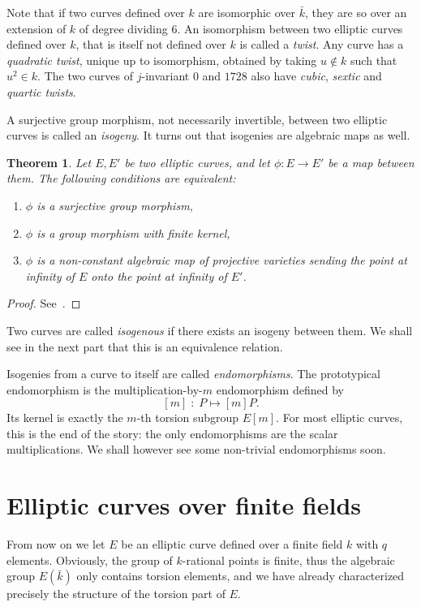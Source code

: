 \documentclass[10pt]{article}
\theoremstyle{plain}
\newtheorem{theorem}{Theorem}
\theoremstyle{definition}
\begin{document}
Note that if two curves defined over $k$ are isomorphic over
$\bar{k}$, they are so over an extension of $k$ of degree dividing
$6$. %
An isomorphism between two elliptic curves defined over $k$, that is
itself not defined over $k$ is called a \emph{twist}. %
Any curve has a \emph{quadratic twist}, unique up to isomorphism,
obtained by taking $u∉k$ such that $u^2∈k$. %
The two curves of $j$-invariant $0$ and $1728$ also have \emph{cubic},
\emph{sextic} and \emph{quartic twists}.

A surjective group morphism, not necessarily invertible, between two
elliptic curves is called an \emph{isogeny}. %
It turns out that isogenies are algebraic maps as well.

\begin{theorem}
  Let $E,E'$ be two elliptic curves, and let $\phi:E→E'$ be a map between
  them. %
  The following conditions are equivalent:
  \begin{enumerate}
  \item $\phi$ is a surjective group morphism,
  \item $\phi$ is a group morphism with finite kernel,
  \item $\phi$ is a non-constant algebraic map of projective varieties
    sending the point at infinity of $E$ onto the point at infinity of
    $E'$.
  \end{enumerate}
\end{theorem}
\begin{proof}
  See~\cite[III, Th.~4.8]{silverman:elliptic}.
\end{proof}

Two curves are called \emph{isogenous} if there exists an isogeny
between them. %
We shall see in the next part that this is an equivalence relation.

Isogenies from a curve to itself are called \emph{endomorphisms}. %
The prototypical endomorphism is the multiplication-by-$m$
endomorphism defined by
\[[m]\;:\; P \mapsto [m]P.\] %
Its kernel is exactly the $m$-th torsion subgroup $E[m]$. %
For most elliptic curves, this is the end of the story: the only
endomorphisms are the scalar multiplications. %
We shall however see some non-trivial endomorphisms soon.


\section{Elliptic curves over finite fields}

From now on we let $E$ be an elliptic curve defined over a finite
field $k$ with $q$ elements. %
Obviously, the group of $k$-rational points is finite, thus the
algebraic group $E(\bar{k})$ only contains torsion elements, and we
have already characterized precisely the structure of the torsion part
of $E$.
\end{document}
